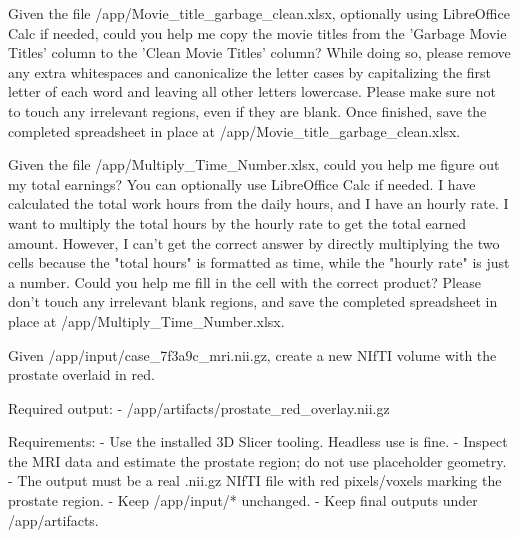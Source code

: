 \begin{instructionbox}
Given the file \textasciigrave{}/app/Movie\_title\_garbage\_clean.xlsx\textasciigrave{}, optionally using LibreOffice Calc if needed, could you help me copy the movie titles from the 'Garbage Movie Titles' column to the 'Clean Movie Titles' column? While doing so, please remove any extra whitespaces and canonicalize the letter cases by capitalizing the first letter of each word and leaving all other letters lowercase. Please make sure not to touch any irrelevant regions, even if they are blank. Once finished, save the completed spreadsheet in place at \textasciigrave{}/app/Movie\_title\_garbage\_clean.xlsx\textasciigrave{}.
\end{instructionbox}

\begin{instructionbox}
Given the file \textasciigrave{}/app/Multiply\_Time\_Number.xlsx\textasciigrave{}, could you help me figure out my total earnings? You can optionally use LibreOffice Calc if needed. I have calculated the total work hours from the daily hours, and I have an hourly rate. I want to multiply the total hours by the hourly rate to get the total earned amount. However, I can't get the correct answer by directly multiplying the two cells because the "total hours" is formatted as time, while the "hourly rate" is just a number. Could you help me fill in the cell with the correct product? Please don't touch any irrelevant blank regions, and save the completed spreadsheet in place at \textasciigrave{}/app/Multiply\_Time\_Number.xlsx\textasciigrave{}.
\end{instructionbox}

\begin{instructionbox}
Given \textasciigrave{}/app/input/case\_7f3a9c\_mri.nii.gz\textasciigrave{}, create a new NIfTI volume with the prostate overlaid in red.

Required output:
- \textasciigrave{}/app/artifacts/prostate\_red\_overlay.nii.gz\textasciigrave{}

Requirements:
- Use the installed 3D Slicer tooling. Headless use is fine.
- Inspect the MRI data and estimate the prostate region; do not use placeholder geometry.
- The output must be a real \textasciigrave{}.nii.gz\textasciigrave{} NIfTI file with red pixels/voxels marking the prostate region.
- Keep \textasciigrave{}/app/input/*\textasciigrave{} unchanged.
- Keep final outputs under \textasciigrave{}/app/artifacts\textasciigrave{}.
\end{instructionbox}

